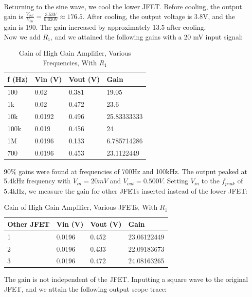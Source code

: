 \documentclass{article}
\begin{document}
    Returning to the sine wave, we cool the lower JFET. Before cooling, the output gain is $\frac{V_{out}}{V_{in}} = \frac{3.53V}{0.020V} \approx 176.5$. After cooling, the output voltage is 3.8V, and the gain is 190. The gain increased by approximately 13.5 after cooling.\\\indent 
    Now we add $R_1$, and  we attained the following gains with a 20 mV input signal:
    \begin{table}[H]
        \centering
        \caption{Gain of High Gain Amplifier, Various Frequencies, With $R_1$}
        \label{my-label}
        \begin{tabular}{llll}
        \textbf{f (Hz)} & \textbf{Vin (V)} & \textbf{Vout (V)} & \textbf{Gain} \\ \hline
        100 & 0.02 & 0.381 & 19.05 \\
        1k & 0.02 & 0.472 & 23.6 \\
        10k & 0.0192 & 0.496 & 25.83333333 \\
        100k & 0.019 & 0.456 & 24 \\
        1M & 0.0196 & 0.133 & 6.785714286 \\
        700 & 0.0196 & 0.453 & 23.1122449
        \end{tabular}
    \end{table}
    90$\%$ gains were found at frequencies of 700Hz and 100kHz. The output peaked at 5.4kHz frequency with $V_{in} = 20mV$ and $V_{out} = 0.500V$. Setting $V_{in}$ to the $f_{peak}$ of 5.4kHz, we measure the gain for other JFETs inserted instead of the lower JFET:
    \begin{table}[H]
        \centering
        \caption{Gain of High Gain Amplifier, Various JFETs, With $R_1$}
        \label{my-label}
        \begin{tabular}{llll}
        \textbf{Other JFET} & \textbf{Vin (V)} & \textbf{Vout (V)} & \textbf{Gain} \\ \hline
        1 & 0.0196 & 0.452 & 23.06122449 \\
        2 & 0.0196 & 0.433 & 22.09183673 \\
        3 & 0.0196 & 0.472 & 24.08163265
        \end{tabular}
    \end{table}
    The gain is not independent of the JFET. Inputting a square wave to the original JFET, and we attain the following output scope trace:\\
\end{document}
